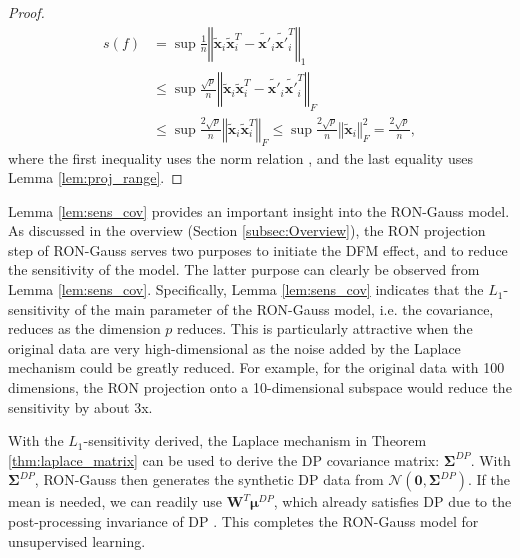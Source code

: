 \documentclass[USenglish,oneside,twocolumn]{article}
\theoremstyle{definition}
\theoremstyle{remark}
\theoremstyle{plain}
\theoremstyle{plain}
\begin{document}
\begin{proof}
\begin{align*}
s(f) & =\sup\frac{1}{n}\left\Vert \widetilde{\mathbf{x}}_{i}\widetilde{\mathbf{x}}_{i}^{T}-\widetilde{\mathbf{x}'}_{i}\widetilde{\mathbf{x}'}_{i}^{T}\right\Vert _{1}\\
 & \leq\sup\frac{\sqrt{p}}{n}\left\Vert \widetilde{\mathbf{x}}_{i}\widetilde{\mathbf{x}}_{i}^{T}-\widetilde{\mathbf{x}'}_{i}\widetilde{\mathbf{x}'}_{i}^{T}\right\Vert _{F}\\
 & \leq\sup\frac{2\sqrt{p}}{n}\left\Vert \widetilde{\mathbf{x}}_{i}\widetilde{\mathbf{x}}_{i}^{T}\right\Vert _{F} \leq\sup\frac{2\sqrt{p}}{n}\left\Vert \widetilde{\mathbf{x}}_{i}\right\Vert _{F}^{2}=\frac{2\sqrt{p}}{n},
\end{align*}
where the first inequality uses the norm relation \cite[page 333]{RefWorks:208},
and the last equality uses Lemma \ref{lem:proj_range}.
\end{proof}

Lemma \ref{lem:sens_cov} provides an important insight into the RON-Gauss
model. As discussed in the overview (Section \ref{subsec:Overview}),
the RON projection step of RON-Gauss serves two purposes \textendash{}
to initiate the DFM effect, and to reduce the sensitivity of the model.
The latter purpose can clearly be observed from Lemma \ref{lem:sens_cov}.
Specifically, Lemma \ref{lem:sens_cov} indicates that the $L_{1}$-sensitivity
of the main parameter of the RON-Gauss model, i.e. the covariance,
reduces as the dimension $p$ reduces. This is particularly attractive
when the original data are very high-dimensional as the noise added
by the Laplace mechanism could be greatly reduced. For example, for
the original data with 100 dimensions, the RON projection onto a 10-dimensional
subspace would reduce the sensitivity by about 3x.

With the $L_{1}$-sensitivity derived, the Laplace mechanism in Theorem
\ref{thm:laplace_matrix} can be used to derive the DP covariance
matrix: $\boldsymbol{\Sigma}^{DP}$. With $\boldsymbol{\Sigma}^{DP}$, RON-Gauss then generates
the synthetic DP data from $\mathcal{N}(\mathbf{0},\boldsymbol{\Sigma}^{DP})$.
If the mean is needed, we can readily use $\mathbf{W}^{T}\boldsymbol{\mu}^{DP}$,
which already satisfies DP due to the post-processing invariance of
DP \cite{RefWorks:185}. This completes the RON-Gauss model for unsupervised
learning. 
\end{document}
